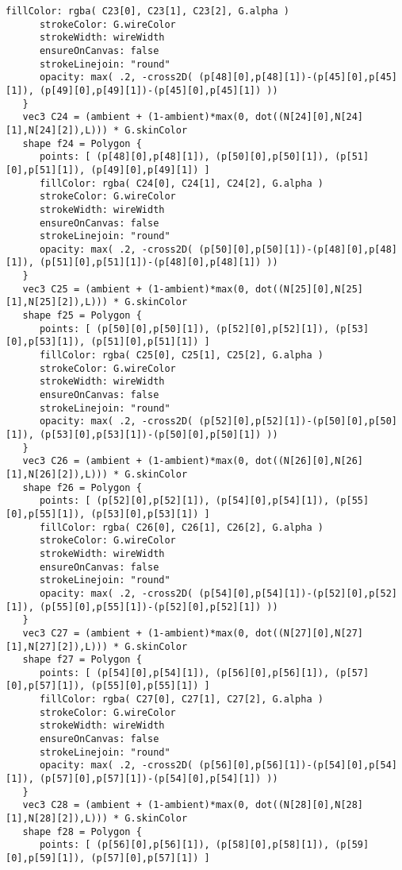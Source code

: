 \begin{lstlisting}[language=Sty-RT,escapechar=@]
      fillColor: rgba( C23[0], C23[1], C23[2], G.alpha )
      strokeColor: G.wireColor
      strokeWidth: wireWidth
      ensureOnCanvas: false
      strokeLinejoin: "round"
      opacity: max( .2, -cross2D( (p[48][0],p[48][1])-(p[45][0],p[45][1]), (p[49][0],p[49][1])-(p[45][0],p[45][1]) ))
   }
   vec3 C24 = (ambient + (1-ambient)*max(0, dot((N[24][0],N[24][1],N[24][2]),L))) * G.skinColor
   shape f24 = Polygon {
      points: [ (p[48][0],p[48][1]), (p[50][0],p[50][1]), (p[51][0],p[51][1]), (p[49][0],p[49][1]) ]
      fillColor: rgba( C24[0], C24[1], C24[2], G.alpha )
      strokeColor: G.wireColor
      strokeWidth: wireWidth
      ensureOnCanvas: false
      strokeLinejoin: "round"
      opacity: max( .2, -cross2D( (p[50][0],p[50][1])-(p[48][0],p[48][1]), (p[51][0],p[51][1])-(p[48][0],p[48][1]) ))
   }
   vec3 C25 = (ambient + (1-ambient)*max(0, dot((N[25][0],N[25][1],N[25][2]),L))) * G.skinColor
   shape f25 = Polygon {
      points: [ (p[50][0],p[50][1]), (p[52][0],p[52][1]), (p[53][0],p[53][1]), (p[51][0],p[51][1]) ]
      fillColor: rgba( C25[0], C25[1], C25[2], G.alpha )
      strokeColor: G.wireColor
      strokeWidth: wireWidth
      ensureOnCanvas: false
      strokeLinejoin: "round"
      opacity: max( .2, -cross2D( (p[52][0],p[52][1])-(p[50][0],p[50][1]), (p[53][0],p[53][1])-(p[50][0],p[50][1]) ))
   }
   vec3 C26 = (ambient + (1-ambient)*max(0, dot((N[26][0],N[26][1],N[26][2]),L))) * G.skinColor
   shape f26 = Polygon {
      points: [ (p[52][0],p[52][1]), (p[54][0],p[54][1]), (p[55][0],p[55][1]), (p[53][0],p[53][1]) ]
      fillColor: rgba( C26[0], C26[1], C26[2], G.alpha )
      strokeColor: G.wireColor
      strokeWidth: wireWidth
      ensureOnCanvas: false
      strokeLinejoin: "round"
      opacity: max( .2, -cross2D( (p[54][0],p[54][1])-(p[52][0],p[52][1]), (p[55][0],p[55][1])-(p[52][0],p[52][1]) ))
   }
   vec3 C27 = (ambient + (1-ambient)*max(0, dot((N[27][0],N[27][1],N[27][2]),L))) * G.skinColor
   shape f27 = Polygon {
      points: [ (p[54][0],p[54][1]), (p[56][0],p[56][1]), (p[57][0],p[57][1]), (p[55][0],p[55][1]) ]
      fillColor: rgba( C27[0], C27[1], C27[2], G.alpha )
      strokeColor: G.wireColor
      strokeWidth: wireWidth
      ensureOnCanvas: false
      strokeLinejoin: "round"
      opacity: max( .2, -cross2D( (p[56][0],p[56][1])-(p[54][0],p[54][1]), (p[57][0],p[57][1])-(p[54][0],p[54][1]) ))
   }
   vec3 C28 = (ambient + (1-ambient)*max(0, dot((N[28][0],N[28][1],N[28][2]),L))) * G.skinColor
   shape f28 = Polygon {
      points: [ (p[56][0],p[56][1]), (p[58][0],p[58][1]), (p[59][0],p[59][1]), (p[57][0],p[57][1]) ]

\end{lstlisting}
